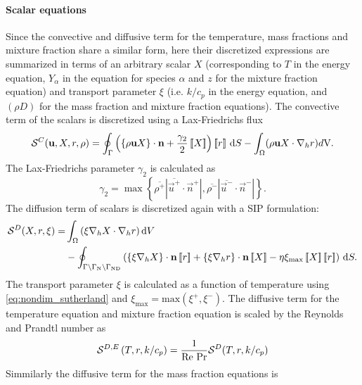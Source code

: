\paragraph{Scalar equations}
Since the convective and diffusive term for the temperature, mass fractions and mixture fraction share a similar form,  here their discretized expressions are summarized in terms of an arbitrary scalar $X$ (corresponding to $T$ in the energy equation, $Y_\alpha$ in the equation for species $\alpha$ and $z$ for the mixture fraction equation) and transport parameter $\xi$ (i.e. $k/c_p$ in the energy equation, and $(\rho D)$ for the mass fraction and mixture fraction equations). The convective term of the scalars is discretized using a Lax-Friedrichs flux
\begin{equation}
	\mathcal{S}^C(\textbf{u},X,r, \rho) =  \oint_{\Gamma}{\left( \left\{{\rho\textbf{u}X }\right\}\cdot \textbf{n} + \frac{\gamma_2}{2}\left[\!\left[{{X}}\right]\!\right]\right)\left[\!\left[{{r}}\right]\!\right] \,\mathrm{d} S}
	- \int_{\Omega}({\rho \textbf{u} X \cdot \nabla_h r) d\text{V}}. \label{eq:scalar_convective}
\end{equation}
The Lax-Friedrichs parameter $\gamma_2$ is calculated as 
\begin{equation}
	\gamma_2  = \max \left\{\overline{\rho^+} |\overline{\vec{u}^+} \cdot \vec{n}^+|,\overline{\rho^-} |\overline{\vec{u}^-} \cdot \vec{n}^-|\right\}.
	\label{eq:vardens_lambda2}
\end{equation}
The diffusion term of scalars is discretized again with a SIP formulation:
\begin{align}
	\mathcal{S}^D(X,r,\xi)= & \int_{\Omega}{ \left(\xi \nabla_h X \cdot\nabla_h r\right) }\dV \notag         \\
	                        & -\oint_{\Gamma \setminus \Gamma_{\text{N}}\setminus \Gamma_{\text{ND}}}{\left(
		\mean{\xi \nabla_h X}\cdot \vec{n}\jump{r} +
		\mean{\xi \nabla_h r}\cdot \vec{n}\jump{X} -
		\eta \xi_{\text{max}} \jump{X} \jump{r}
		\right) \dS.
	} \label{eq:Temp_diffusive}
\end{align}
The transport parameter $\xi$ is calculated as a function of temperature using \cref{eq:nondim_sutherland} and $\xi_{\text{max}} = \text{max}(\xi^{+}, \xi^{-})$.
The diffusive term for the temperature equation  and mixture fraction equation is scaled by the Reynolds and Prandtl number as
\begin{equation}
\mathcal{S}^{D,E}\left(T,r,k/c_p\right) = \frac{1}{\text{Re}~\text{Pr}} \mathcal{S}^D(T,r,k/c_p)
\end{equation}
Simmilarly the diffusive term for the mass fraction equations is
